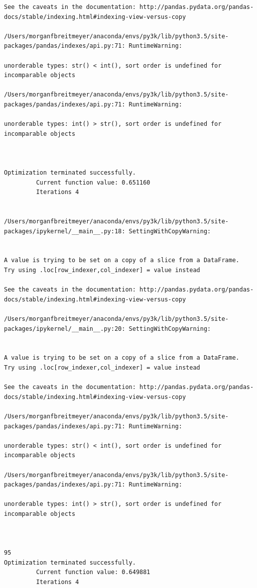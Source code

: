 \begin{lstlisting}
See the caveats in the documentation: http://pandas.pydata.org/pandas-docs/stable/indexing.html#indexing-view-versus-copy

/Users/morganfbreitmeyer/anaconda/envs/py3k/lib/python3.5/site-packages/pandas/indexes/api.py:71: RuntimeWarning:

unorderable types: str() < int(), sort order is undefined for incomparable objects

/Users/morganfbreitmeyer/anaconda/envs/py3k/lib/python3.5/site-packages/pandas/indexes/api.py:71: RuntimeWarning:

unorderable types: int() > str(), sort order is undefined for incomparable objects



Optimization terminated successfully.
         Current function value: 0.651160
         Iterations 4


/Users/morganfbreitmeyer/anaconda/envs/py3k/lib/python3.5/site-packages/ipykernel/__main__.py:18: SettingWithCopyWarning:


A value is trying to be set on a copy of a slice from a DataFrame.
Try using .loc[row_indexer,col_indexer] = value instead

See the caveats in the documentation: http://pandas.pydata.org/pandas-docs/stable/indexing.html#indexing-view-versus-copy

/Users/morganfbreitmeyer/anaconda/envs/py3k/lib/python3.5/site-packages/ipykernel/__main__.py:20: SettingWithCopyWarning:


A value is trying to be set on a copy of a slice from a DataFrame.
Try using .loc[row_indexer,col_indexer] = value instead

See the caveats in the documentation: http://pandas.pydata.org/pandas-docs/stable/indexing.html#indexing-view-versus-copy

/Users/morganfbreitmeyer/anaconda/envs/py3k/lib/python3.5/site-packages/pandas/indexes/api.py:71: RuntimeWarning:

unorderable types: str() < int(), sort order is undefined for incomparable objects

/Users/morganfbreitmeyer/anaconda/envs/py3k/lib/python3.5/site-packages/pandas/indexes/api.py:71: RuntimeWarning:

unorderable types: int() > str(), sort order is undefined for incomparable objects



95
Optimization terminated successfully.
         Current function value: 0.649881
         Iterations 4



\end{lstlisting}
